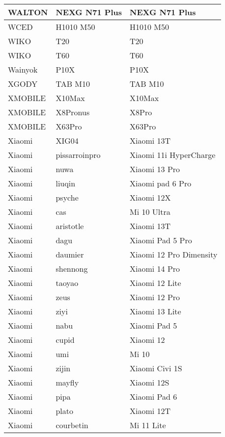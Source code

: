 \begin{tabularx}{\linewidth}{|l|X|X|}
        WALTON & NEXG N71 Plus & NEXG N71 Plus \\ \hline
        WCED & H1010 M50 & H1010 M50 \\ \hline
        WIKO & T20 & T20 \\ \hline
        WIKO & T60 & T60 \\ \hline
        Wainyok & P10X & P10X \\ \hline
        XGODY & TAB M10 & TAB M10 \\ \hline
        XMOBILE & X10Max & X10Max \\ \hline
        XMOBILE & X8Pronus & X8Pro \\ \hline
        XMOBILE & X63Pro & X63Pro \\ \hline
        Xiaomi & XIG04 & Xiaomi 13T \\ \hline
        Xiaomi & pissarroinpro & Xiaomi 11i HyperCharge \\ \hline
        Xiaomi & nuwa & Xiaomi 13 Pro \\ \hline
        Xiaomi & liuqin & Xiaomi pad 6 Pro \\ \hline
        Xiaomi & psyche & Xiaomi 12X \\ \hline
        Xiaomi & cas & Mi 10 Ultra \\ \hline
        Xiaomi & aristotle & Xiaomi 13T \\ \hline
        Xiaomi & dagu & Xiaomi Pad 5 Pro \\ \hline
        Xiaomi & daumier & Xiaomi 12 Pro Dimensity \\ \hline
        Xiaomi & shennong & Xiaomi 14 Pro \\ \hline
        Xiaomi & taoyao & Xiaomi 12 Lite \\ \hline
        Xiaomi & zeus & Xiaomi 12 Pro \\ \hline
        Xiaomi & ziyi & Xiaomi 13 Lite \\ \hline
        Xiaomi & nabu & Xiaomi Pad 5 \\ \hline
        Xiaomi & cupid & Xiaomi 12 \\ \hline
        Xiaomi & umi & Mi 10 \\ \hline
        Xiaomi & zijin & Xiaomi Civi 1S \\ \hline
        Xiaomi & mayfly & Xiaomi 12S \\ \hline
        Xiaomi & pipa & Xiaomi Pad 6 \\ \hline
        Xiaomi & plato & Xiaomi 12T \\ \hline
        Xiaomi & courbetin & Mi 11 Lite \\ \hline

\end{tabularx}
